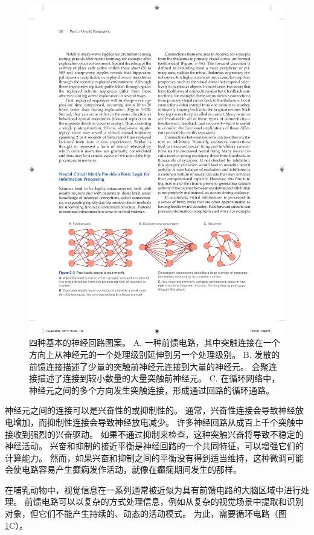 \begin{figure}[htbp]
	\centering
	\includegraphics[width=1.0\linewidth]{chap05/fig_5_3}
	\caption{四种基本的神经回路图案。 
		A. 一种前馈电路，其中突触连接在一个方向上从神经元的一个处理级别延伸到另一个处理级别。 
		B. 发散的前馈连接描述了少量的突触前神经元连接到大量的神经元。 会聚连接描述了连接到较小数量的大量突触前神经元。 
		C. 在循环网络中，神经元之间的多个方向发生突触连接，形成通过回路的循环通路。}
	\label{fig:5_3}
\end{figure}


神经元之间的连接可以是兴奋性的或抑制性的。 
通常，兴奋性连接会导致神经放电增加，而抑制性连接会导致神经放电减少。 
许多神经回路从成百上千个突触中接收到强烈的兴奋驱动。 
如果不通过抑制来检查，这种突触兴奋将导致不稳定的神经活动。 
兴奋和抑制的接近平衡是神经回路的一个共同特征，可以增强它们的计算能力。 
然而，如果兴奋和抑制之间的平衡没有得到适当维持，这种微调可能会使电路容易产生癫痫发作活动，就像在癫痫期间发生的那样。


在哺乳动物中，视觉信息在一系列通常被近似为具有前馈电路的大脑区域中进行处理。
前馈电路可以以复杂的方式处理信息，例如从复杂的视觉场景中提取和识别对象，但它们不能产生持续的、动态的活动模式。 
为此，需要循环电路（图 \ref{fig:5_3}C）。


